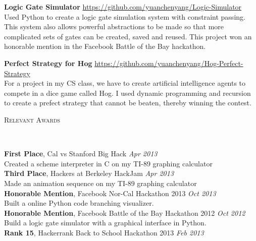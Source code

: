 \documentclass[9pt]{article}
\newenvironment{changemargin}[2]{%
  \begin{list}{}{%
      \setlength{\topsep}{0pt}%
      \setlength{\leftmargin}{#1}%
      \setlength{\rightmargin}{#2}%
      \setlength{\listparindent}{\parindent}%
      \setlength{\itemindent}{\parindent}%
      \setlength{\parsep}{\parskip}%
    }%
  \item[]}{\end{list}
}
\newcommand{\lineover}{
  \begin{changemargin}{-0.05in}{-0.05in}
    \vspace*{-8pt}
    \hrulefill \\
    \vspace*{-2pt}
  \end{changemargin}
}
\newcommand{\header}[1]{
  \begin{changemargin}{-0.5in}{-0.5in}
    \scshape{#1}\\
    \lineover
  \end{changemargin}
}
\newenvironment{body} {
  \vspace*{-16pt}
  \begin{changemargin}{-0.25in}{-0.5in}
  }
  {\end{changemargin}
}
\begin{document}
\begin{body}
 \textbf{Logic Gate Simulator} \hfill \url{https://github.com/yuanchenyang/Logic-Simulator}\\
 Used Python to create a logic gate simulation system with constraint passing. This system also allows powerful abstractions to be made so that more complicated sets of gates can be created, saved and reused. This project won an honorable mention in the Facebook Battle of the Bay hackathon.\\
   \medskip

   \textbf{Perfect Strategy for Hog} \hfill \url{https://github.com/yuanchenyang/Hog-Perfect-Strategy}\\
   For a project in my CS class, we have to create artificial intelligence agents to compete in a dice game called Hog. I used dynamic programming and recursion to create a prefect strategy that cannot be beaten, thereby winning the contest. \\
   \medskip
\end{body}

\smallskip


\header{Relevant Awards}

\begin{body}
  \vspace{14pt}
  \textbf{First Place}, Cal vs Stanford Big Hack \hfill{} \emph{Apr 2013}\\
  Created a scheme interpreter in C on my TI-89 graphing calculator \\
  \textbf{Third Place}, Hackers at Berkeley HackJam \hfill{} \emph{Apr 2013}\\
  Made an animation sequence on my TI-89 graphing calculator \\
  \textbf{Honorable Mention}, Facebook Nor-Cal Hackathon 2013 \hfill{} \emph{Oct 2013}\\
  Built a online Python code branching visualizer.\\
  \textbf{Honorable Mention}, Facebook Battle of the Bay Hackathon 2012 \hfill{} \emph{Oct 2012}\\
  Build a logic gate simulator with a graphical interface in Python. \\
  \textbf{Rank 15}, Hackerrank Back to School Hackathon 2013 \hfill{} \emph{Feb 2013}\\
\end{body}
\end{document}
